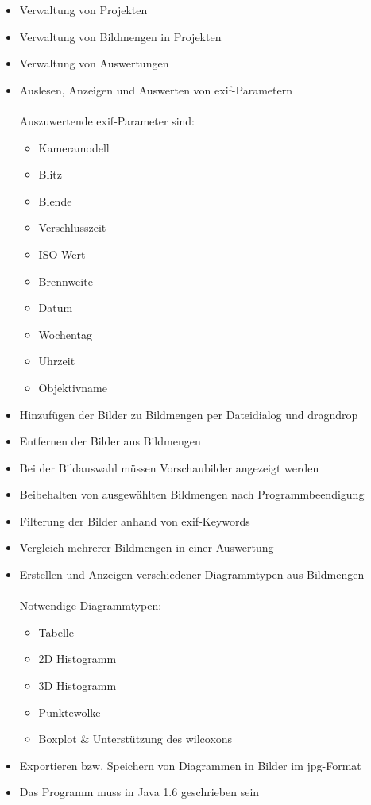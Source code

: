 \begin{itemize}
	\item Verwaltung von Projekten
	\item Verwaltung von Bildmengen in Projekten
	\item Verwaltung von Auswertungen
	\item Auslesen, Anzeigen und Auswerten von \gls{exif}-Parametern\\\\
				Auszuwertende \gls{exif}-Parameter sind:
				\label{subsec:auszuwertendedaten}
				\begin{itemize}
					\item Kameramodell
					\item Blitz
					\item Blende 
					\item Verschlusszeit
					\item ISO-Wert
					\item Brennweite
					\item Datum
					\item Wochentag
					\item Uhrzeit
					\item Objektivname
				\end{itemize}
	\item Hinzufügen der Bilder zu Bildmengen per Dateidialog und \gls{dragndrop}
	\item Entfernen der Bilder aus Bildmengen
	\item Bei der Bildauswahl müssen Vorschaubilder angezeigt werden
	\item Beibehalten von ausgewählten Bildmengen nach Programmbeendigung
	\item Filterung der Bilder anhand von \gls{exif}-Keywords
	\item Vergleich mehrerer Bildmengen in einer Auswertung
	\item Erstellen und Anzeigen verschiedener Diagrammtypen aus Bildmengen\\\\
				Notwendige Diagrammtypen:
				\begin{itemize}
					\item Tabelle
					\item 2D Histogramm
					\item 3D Histogramm
					\item Punktewolke
					\item Boxplot \& Unterstützung des \gls{wilcoxon}s
				\end{itemize}
	\item Exportieren bzw. Speichern von Diagrammen in Bilder im \gls{jpg}-Format
	\item Das Programm muss in Java 1.6 geschrieben sein
\end{itemize}

